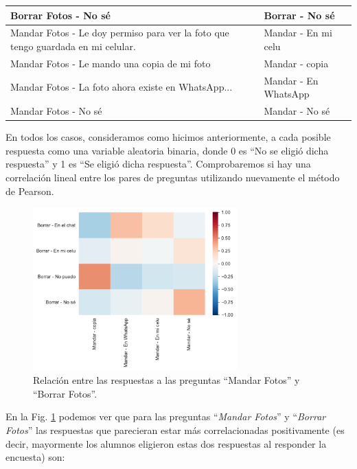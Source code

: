 \begin{table}[h]
{\begin{tabular}{|l|l|}
Borrar Fotos - No sé                                                                  & Borrar - No sé          \\ \hline
Mandar Fotos - Le doy permiso para ver la foto que tengo guardada en mi celular.      & Mandar - En mi celu     \\ \hline
Mandar Fotos - Le mando una copia de mi foto                                          & Mandar - copia          \\ \hline
Mandar Fotos - La foto ahora existe en WhatsApp...                                    & Mandar - En WhatsApp    \\ \hline
Mandar Fotos - No sé                                                                  & Mandar - No sé          \\ \hline
\end{tabular}%
}
\end{table}

\newpage

En todos los casos, consideramos como hicimos anteriormente, a cada posible respuesta como una variable aleatoria binaria, donde 0 es “No se eligió dicha respuesta” y 1 es “Se eligió dicha respuesta”. Comprobaremos si hay una correlación lineal entre los pares de preguntas utilizando nuevamente el método de Pearson.

\begin{figure}[h]
    \centering
    \includegraphics[width=0.7\textwidth]{images_analisis/29.pdf}
    \caption{Relación entre las respuestas a las preguntas “Mandar Fotos” y “Borrar Fotos”.}
    \label{fig:analisis29}
\end{figure}

En la Fig. \ref{fig:analisis29} podemos ver que para las preguntas ``\textit{Mandar Fotos}'' y ``\textit{Borrar Fotos}'' las respuestas que parecieran estar más correlacionadas positivamente (es decir, mayormente los alumnos eligieron estas dos respuestas al responder la encuesta) son:

